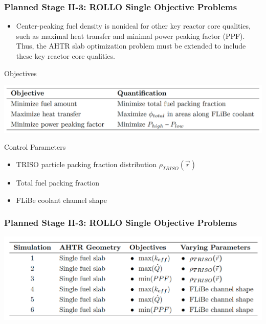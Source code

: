 \begin{frame}
    \frametitle{Planned Stage II-3: ROLLO Single Objective Problems}
    \begin{itemize}
        \item Center-peaking fuel density is nonideal for other key reactor core 
        qualities, such as maximal heat transfer and minimal power peaking factor (PPF).
        Thus, the AHTR slab optimization problem must be extended to include 
        these key reactor core qualities. 
    \end{itemize}
    \begin{block}{Objectives}
        \vspace{-0.2cm}
    \begin{table}
        \caption{ROLLO optimization problem objectives with their quantification 
        descriptions.}
        \includegraphics[width=0.7\linewidth]{figures/opt-obj.png}
    \end{table}
\end{block}
\vspace{-0.5cm}
\begin{block}{Control Parameters}
    \begin{itemize}
        \item TRISO particle packing fraction distribution $\rho_{TRISO}(\vec{r})$
        \item Total fuel packing fraction
        \item FLiBe coolant channel shape 
    \end{itemize}
\end{block}
\end{frame}

\begin{frame}
    \frametitle{Planned Stage II-3: ROLLO Single Objective Problems}
    \begin{table}
        \caption{Proposed ROLLO simulations for AHTR fuel assembly single 
        objective optimization.
        PF: Total Fuel Packing Fraction, $\dot{Q}$: Heat transfer, $PPF$: Power Peaking Factor, 
        $\rho_{TRISO}(\vec{r})$: \gls{TRISO} particle distribution}
        \includegraphics[width=0.8\linewidth]{figures/single-obj.png}
    \end{table}
\end{frame}